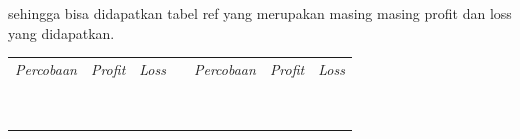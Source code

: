 sehingga bisa didapatkan tabel ref yang merupakan masing masing profit dan loss yang didapatkan. 

\begin{table}[H]
  \centering
  \begin{tabular}{|c|c|l|l|l|l|l|}
  \cline{1-3} \cline{5-7}
  \textit{Percobaan}     & \textit{Profit}       & \textit{Loss} &  & \multicolumn{1}{c|}{\textit{Percobaan}} & \multicolumn{1}{c|}{\textit{Profit}} & \textit{Loss} \\ \cline{1-3} \cline{5-7} 
                         &                       &               &  &                                         &                                      &               \\ \cline{1-3} \cline{5-7} 
                         &                       &               &  &                                         &                                      &               \\ \cline{1-3} \cline{5-7} 
                         &                       &               &  &                                         &                                      &               \\ \cline{1-3} \cline{5-7} 
                         &                       &               &  &                                         &                                      &               \\ \cline{1-3} \cline{5-7} 
                         &                       &               &  &                                         &                                      &               \\ \cline{1-3} \cline{5-7} 
                         &                       &               &  &                                         &                                      &               \\ \cline{1-3} \cline{5-7} 
                         &                       &               &  &                                         &                                      &               \\ \cline{1-3} \cline{5-7} 
                         &                       &               &  &                                         &                                      &               \\ \cline{1-3} \cline{5-7} 
                         &                       &               &  &                                         &                                      &               \\ \cline{1-3} \cline{5-7} 

\end{tabular}
\end{table}
